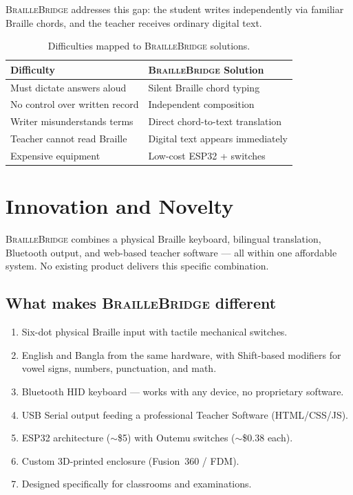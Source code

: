 \documentclass[11pt,a4paper,twoside]{article}
\newcommand{\projectname}{\textsc{BrailleBridge}}
\begin{document}
\projectname{} addresses this gap: the student writes independently via
familiar Braille chords, and the teacher receives ordinary digital text.

\begin{table}[H]\centering
\caption{Difficulties mapped to \projectname{} solutions.}\label{tab:problem-solution}
\begin{tabular}{p{} p{}}\toprule
\bfseries Difficulty & \bfseries \projectname{} Solution \\\midrule
Must dictate answers aloud & Silent Braille chord typing \\
No control over written record & Independent composition \\
Writer misunderstands terms & Direct chord-to-text translation \\
Teacher cannot read Braille & Digital text appears immediately \\
Expensive equipment & Low-cost ESP32 + switches \\\bottomrule
\end{tabular}\end{table}

\section{Innovation and Novelty}

\projectname{} combines a physical Braille keyboard, bilingual translation,
Bluetooth output, and web-based teacher software --- all within one
affordable system. No existing product delivers this specific combination.

\subsection*{What makes \projectname{} different}
\begin{enumerate}[nosep]
  \item Six-dot physical Braille input with tactile mechanical switches.
  \item English and Bangla from the same hardware, with Shift-based modifiers
    for vowel signs, numbers, punctuation, and math.
  \item Bluetooth HID keyboard --- works with any device, no proprietary software.
  \item USB Serial output feeding a professional Teacher Software (HTML/CSS/JS).
  \item ESP32 architecture ($\sim$\$5) with Outemu switches ($\sim$\$0.38 each).
  \item Custom 3D-printed enclosure (Fusion~360 / FDM).
  \item Designed specifically for classrooms and examinations.
\end{enumerate}
\end{document}
